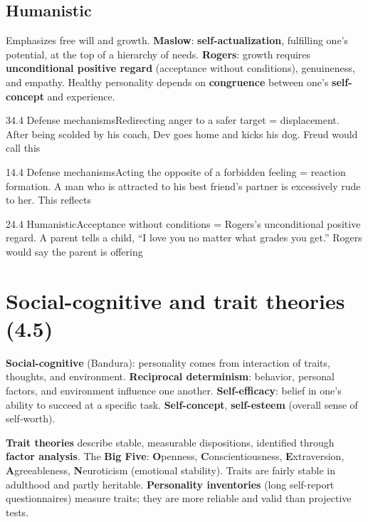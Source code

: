 \documentclass[11pt]{article}
\begin{document}
\subsection{Humanistic}
Emphasizes free will and growth. \textbf{Maslow}: \textbf{self-actualization}, fulfilling one's potential, at the top of a hierarchy of needs. \textbf{Rogers}: growth requires \textbf{unconditional positive regard} (acceptance without conditions), genuineness, and empathy. Healthy personality depends on \textbf{congruence} between one's \textbf{self-concept} and experience.

\begin{q}{3}{4.4 Defense mechanisms}{Redirecting anger to a safer target = displacement.}
After being scolded by his coach, Dev goes home and kicks his dog. Freud would call this
\end{q}

\begin{q}{1}{4.4 Defense mechanisms}{Acting the opposite of a forbidden feeling = reaction formation.}
A man who is attracted to his best friend's partner is excessively rude to her. This reflects
\end{q}

\begin{q}{2}{4.4 Humanistic}{Acceptance without conditions = Rogers's unconditional positive regard.}
A parent tells a child, ``I love you no matter what grades you get.'' Rogers would say the parent is offering
\end{q}

\section{Social-cognitive and trait theories (4.5)}

\textbf{Social-cognitive} (Bandura): personality comes from interaction of traits, thoughts, and environment. \textbf{Reciprocal determinism}: behavior, personal factors, and environment influence one another. \textbf{Self-efficacy}: belief in one's ability to succeed at a specific task. \textbf{Self-concept}, \textbf{self-esteem} (overall sense of self-worth).

\textbf{Trait theories} describe stable, measurable dispositions, identified through \textbf{factor analysis}. The \textbf{Big Five}: \textbf{O}penness, \textbf{C}onscientiousness, \textbf{E}xtraversion, \textbf{A}greeableness, \textbf{N}euroticism (emotional stability). Traits are fairly stable in adulthood and partly heritable. \textbf{Personality inventories} (long self-report questionnaires) measure traits; they are more reliable and valid than projective tests.
\end{document}

